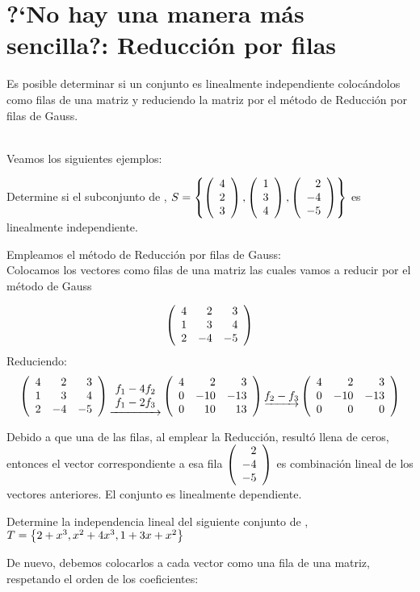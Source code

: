 \section{?`No hay una manera más sencilla?: Reducción por filas}
Es posible determinar si un conjunto es linealmente independiente colocándolos como filas de una matriz y reduciendo la matriz por el método de Reducción por filas de Gauss.

~\\
Veamos los siguientes ejemplos:
~\\

\begin{ejemplo}
Determine si el subconjunto de \rtres, $S=\llav{\vectrtres{4}{2}{3},\vectrtres{1}{3}{4}, \vectrtres{2}{-4}{-5}}$ es linealmente independiente.
\end{ejemplo}



Empleamos el método de Reducción por filas de Gauss:
~\\
Colocamos los vectores como filas de una matriz las cuales vamos a reducir por el método de Gauss

\[\reducir{rrr}{
4&2&3\\
1&3&4\\
2&-4&-5
}\]
Reduciendo:
\[
\reducir{rrr}{
4&2&3\\
1&3&4\\
2&-4&-5
}
\underrightarrow{\begin{array}{c}
    f_1 - 4f_2\\
    f_1 - 2f_3 
\end{array}}
\reducir{rrr}{
4&2&3\\
0&-10&-13\\
0&10&13
}
\underrightarrow{f_2 - f_3}
\reducir{rrr}{
4&2&3\\
0&-10&-13\\
0&0&0
}
\]

Debido a que una de las filas, al emplear la Reducción, resultó llena de ceros, entonces el vector correspondiente a esa fila $\vectrtres{2}{-4}{-5}$ es combinación lineal de los vectores anteriores.
El conjunto es linealmente dependiente.


\begin{ejemplo}
Determine la independencia lineal del siguiente conjunto de \ptres, 
$T=\llav{2+x^3, x^2+4x^3, 1+3x+x^2}$
\end{ejemplo}


De nuevo, debemos colocarlos a cada vector como una fila de una matriz, respetando el orden de los coeficientes:

